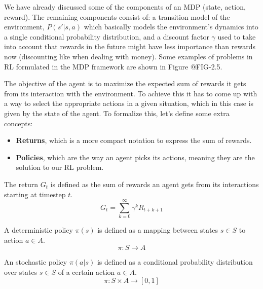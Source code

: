 We have already discussed  some of the components of an MDP (state, action, reward).
The remaining components consist of: a transition model of the environment, $P(s'|s,a)$
which basically models the environment's dynamics into a single conditional probability
distribution, and a discount factor $\gamma$ used to take into account that rewards in the future might have 
less importance than rewards now (discounting like when dealing with money). Some examples 
of problems in RL formulated in the MDP framework are shown in Figure @FIG-2.5.

\figMdpSamples

The objective of the agent is to maximize the expected sum of rewards it gets from
its interaction with the environment. To achieve this it has to come up with a
way to select the appropriate actions in a given situation, which in this case is given
by the state of the agent. To formalize this, let's  define some extra concepts:

\begin{itemize}
    \item \textbf{Returns}, which is a more compact notation to express the sum of rewards.
    \item \textbf{Policies}, which are the way an agent picks its actions, meaning they
          are the solution to our RL problem.
\end{itemize}

\newpage

\begin{definition}
    The return $G_{t}$ is defined as the sum of rewards an agent gets from its
    interactions starting at timestep $t$.
    \begin{equation}
        G_{t} = \sum_{k=0}^{\infty} \gamma^{k} R_{t+k+1}
    \end{equation}
\end{definition}

\begin{definition}
    A deterministic policy $\pi(s)$ is defined as a mapping between states $s \in S$
    to action $a \in A$.
    \begin{equation}
        \pi : S \rightarrow A
    \end{equation}
\end{definition}

\begin{definition}
    An stochastic policy $\pi(a|s)$ is defined as a conditional probability distribution over
    states $s \in S$ of a certain action $a \in A$.
    \begin{equation}
        \pi : S \times A \rightarrow [0,1]
    \end{equation}
\end{definition}

